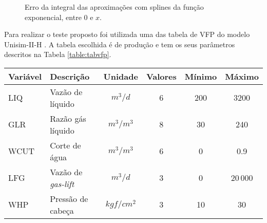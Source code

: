 \documentclass[final,5p]{elsarticle}
\numberwithin{equation}{section}
\begin{document}
        \begin{figure}[hbt!] 
            \caption{Erro da integral das aproximações com splines da função exponencial, entre 0 e $x$.}
            \label{fig:intexp}
        \end{figure}
        
        Para realizar o teste proposto foi utilizada uma das tabela de VFP do modelo Unisim-II-H \cite{maschio2018case}. A tabela escolhida é de produção e tem os seus parâmetros descritos na Tabela \ref{table:tabvfp}.

        \begin{table*} 
            \caption{Parâmetros da tabela de VFP utilizada nas comparações. O parâmetro principal (BHP) é em $kgf/cm^2$.}
            \label{table:tabvfp}
            \begin{tabular}{ l l c c c c }
                \hline
                Variável & Descrição & Unidade & Valores & Mínimo & Máximo \\ 
                \hline
                LIQ  & Vazão de líquido         & $m^3/d$    & 6 & 200 &   3200 \\
                GLR  & Razão gás líquido        & $m^3/m^3$  & 8 & 30  &    240 \\
                WCUT & Corte de água            & $m^3/m^3$  & 6 &  0  &    0.9 \\
                LFG  & Vazão de \emph{gas-lift} & $m^3/d$    & 3 &  0  &  20$\,$000 \\
                WHP  & Pressão de cabeça        & $kgf/cm^2$ & 3 & 10  &     30 \\
                \hline
            \end{tabular}
        \end{table*}
\end{document}
